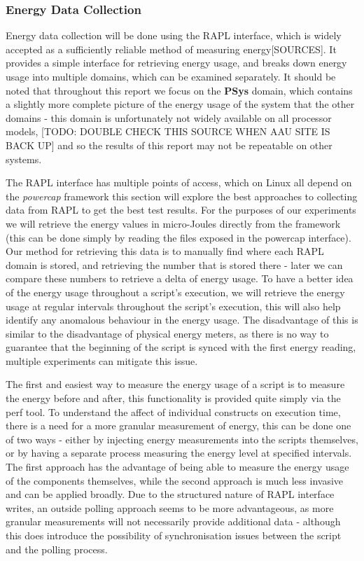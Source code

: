 \subsubsection{Energy Data Collection}\label{subsubsec:intro-data-collection}
Energy data collection will be done using the RAPL interface, which is widely accepted as a sufficiently reliable method of
measuring energy[SOURCES].
It provides a simple interface for retrieving energy usage, and breaks down energy usage into multiple domains, which can
be examined separately.
It should be noted that throughout this report we focus on the \textbf{PSys} domain, which contains a slightly more
complete picture of the energy usage of the system that the other domains - this domain is unfortunately not widely
available on all processor models\cite{RAPLDomainInfo}, [TODO: DOUBLE CHECK THIS SOURCE WHEN AAU SITE IS BACK UP] and so the results of this report may not be repeatable on other systems.

The RAPL interface has multiple points of access, which on Linux all depend on the \textit{powercap}
framework\cite{LinuxPowerCap} this section will explore the best approaches to collecting data from RAPL to get the best
test results.
For the purposes of our experiments we will retrieve the energy values in micro-Joules directly from the framework (this
can be done simply by reading the files exposed in the powercap interface).
Our method for retrieving this data is to manually find where each RAPL domain is stored, and retrieving the number that
is stored there - later we can compare these numbers to retrieve a delta of energy usage.
To have a better idea of the energy usage throughout a script's execution, we will retrieve the energy usage at regular
intervals throughout the script's execution, this will also help identify any anomalous behaviour in the energy usage.
The disadvantage of this is similar to the disadvantage of physical energy meters, as there is no way to guarantee that
the beginning of the script is synced with the first energy reading, multiple experiments can mitigate this issue.

The first and easiest way to measure the energy usage of a script is to measure the energy before and after, this
functionality is provided quite simply via the perf tool.
To understand the affect of individual constructs on execution time, there is a need for a more granular measurement of
energy, this can be done one of two ways - either by injecting energy measurements into the scripts themselves, or
by having a separate process measuring the energy level at specified intervals.
The first approach has the advantage of being able to measure the energy usage of the components themselves, while the
second approach is much less invasive and can be applied broadly.
Due to the structured nature of RAPL interface writes, an outside polling approach seems to be more advantageous, as
more granular measurements will not necessarily provide additional data - although this does introduce the possibility
of synchronisation issues between the script and the polling process.

